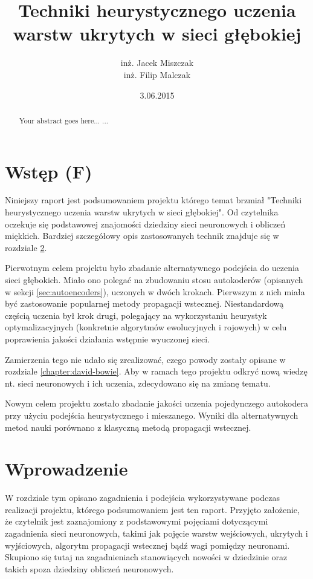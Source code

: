 \documentclass[11pt,a4paper,oneside]{report}
\begin{document}
\title{Techniki heurystycznego uczenia warstw ukrytych w sieci głębokiej}
\author{inż. Jacek Miszczak \\ inż. Filip Malczak}
\date{3.06.2015}
\maketitle

\begin{abstract}
Your abstract goes here...
...
\end{abstract}

\tableofcontents

\chapter{Wstęp (F)}

Niniejszy raport jest podsumowaniem projektu którego temat brzmiał "Techniki heurystycznego uczenia warstw ukrytych w sieci głębokiej". Od czytelnika oczekuje się podstawowej znajomości dziedziny sieci neuronowych i obliczeń miękkich. Bardziej szczegółowy opis zastosowanych technik znajduje się w rozdziale \ref{chap:introduction}.

Pierwotnym celem projektu było zbadanie alternatywnego podejścia do uczenia sieci głębokich. Miało ono polegać na zbudowaniu stosu autokoderów (opisanych w sekcji \ref{sec:autoencoders}), uczonych w dwóch krokach. Pierwszym z nich miała być zastosowanie popularnej metody propagacji wstecznej. Niestandardową częścią uczenia był krok drugi, polegający na wykorzystaniu heurystyk optymalizacyjnych (konkretnie algorytmów ewolucyjnych i rojowych) w celu poprawienia jakości działania wstępnie wyuczonej sieci.

Zamierzenia tego nie udało się zrealizować, czego powody zostały opisane w rozdziale \ref{chapter:david-bowie}. Aby w ramach tego projektu odkryć nową wiedzę nt. sieci neuronowych i ich uczenia, zdecydowano się na zmianę tematu.

Nowym celem projektu zostało zbadanie jakości uczenia pojedynczego autokodera przy użyciu podejścia heurystycznego i mieszanego. Wyniki dla alternatywnych metod nauki porównano z klasyczną metodą propagacji wstecznej.

\chapter{Wprowadzenie}
\label{chap:introduction}

W rozdziale tym opisano zagadnienia i podejścia wykorzystywane podczas realizacji projektu, którego podsumowaniem jest ten raport. Przyjęto założenie, że czytelnik jest zaznajomiony z podstawowymi pojęciami dotyczącymi zagadnienia sieci neuronowych, takimi jak pojęcie warstw wejściowych, ukrytych i wyjściowych, algorytm propagacji wstecznej bądź wagi pomiędzy neuronami. Skupiono się tutaj na zagadnieniach stanowiących nowości w dziedzinie oraz takich spoza dziedziny obliczeń neuronowych.
\end{document}
